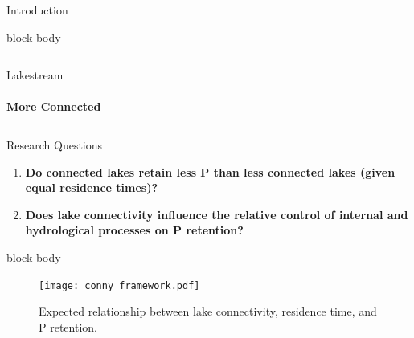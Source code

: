 \documentclass[final,hyperref={pdfpagelabels=false}]{beamer}
\begin{document}
\begin{frame}[t]
\begin{columns}[t]
\begin{column}{.465\textwidth}
\begin{block}{Introduction}
{\begin{beamercolorbox}[wd=\textwidth,rounded=true]{block body}
\begin{columns}
\begin{column}{0.3\textwidth}
\centering
\large Lakestream \\
\vspace{0.5em}
 \\
\textbf{More Connected}
\end{column}
\end{columns}
\vspace{0.3em}
\end{beamercolorbox}
}


\vspace{1.4em}
\end{block}
\vspace{0.5em}
\begin{block}{Research Questions}

\begin{enumerate} \large 
\item \textbf{Do connected lakes retain less P than less connected lakes (given equal residence times)?}
\vspace{1em}
\item \textbf{Does lake connectivity influence the relative control of internal and hydrological processes on P retention?}
\end{enumerate}

\vspace{1em}
{
\begin{beamercolorbox}[wd=\textwidth,rounded=true]{block body}

\begin{figure}
  \texttt{[image: conny\_framework.pdf]}
  \caption{Expected relationship between lake connectivity, residence time, and P retention.}
\end{figure}


\end{beamercolorbox}
}
\vspace{0.5em}
\end{block}


\vspace{1em}

\end{column} %


\end{columns}
\end{frame}
\end{document}
